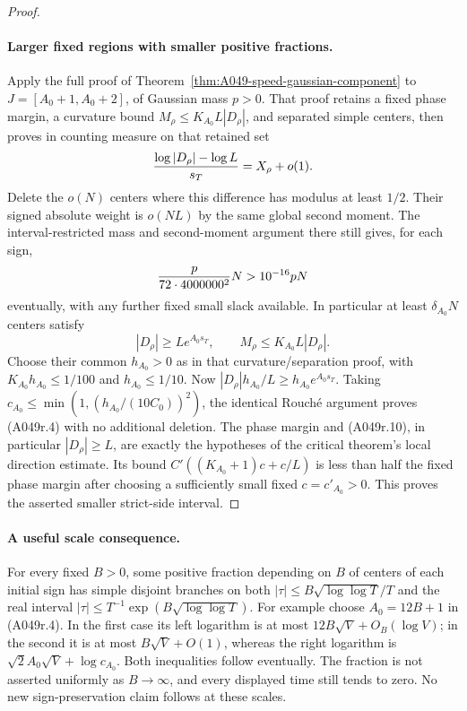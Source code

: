 \begin{proof}
\paragraph{Larger fixed regions with smaller positive fractions.}
Apply the full proof of Theorem~\ref{thm:A049-speed-gaussian-component}
to $J=[A_0+1,A_0+2]$, of Gaussian mass $p>0$.
That proof retains a fixed phase margin, a curvature bound
$M_\rho\le K_{A_0}L|D_\rho|$, and separated simple centers,
then proves in counting measure on that retained set
\[
 {\log|D_\rho|-\log L\over s_T}=X_\rho+o(1).
\]
Delete the $o(N)$ centers where this difference has modulus
at least $1/2$. Their signed absolute weight is $o(NL)$ by the
same global second moment. The interval-restricted mass and
second-moment argument there still gives, for each sign,
\[
 {p\over72\cdot4000000^2}N>10^{-16}pN
\]
eventually, with any further fixed small slack available.
In particular at least $\delta_{A_0}N$ centers satisfy
\[
       |D_\rho|\ge L e^{A_0s_T},\qquad
       M_\rho\le K_{A_0}L|D_\rho|.
\tag{A049r.10}
\]
Choose their common $h_{A_0}>0$ as in that curvature/separation
proof, with $K_{A_0}h_{A_0}\le1/100$ and $h_{A_0}\le1/10$.
Now $|D_\rho|h_{A_0}/L\ge h_{A_0}e^{A_0s_T}$.
Taking
$c_{A_0}\le\min(1,(h_{A_0}/(10C_0))^2)$, the identical
Rouch\'e argument proves (A049r.4) with no additional deletion.
The phase margin and (A049r.10), in particular $|D_\rho|\ge L$,
are exactly the hypotheses of the critical theorem's local
direction estimate. Its bound
$C'((K_{A_0}+1)c+c/L)$ is less than half the fixed phase margin
after choosing a sufficiently small fixed $c=c'_{A_0}>0$.
This proves the asserted smaller strict-side interval.
\end{proof}

\paragraph{A useful scale consequence.}
For every fixed $B>0$, some positive fraction depending on $B$
of centers of each initial sign has simple disjoint branches on
both $|\tau|\le B\sqrt{\log\log T}/T$ and the real interval
$|\tau|\le T^{-1}\exp(B\sqrt{\log\log T})$.
For example choose $A_0=12B+1$ in (A049r.4).
In the first case its left logarithm is at most
$12B\sqrt V+O_B(\log V)$; in the second it is at most
$B\sqrt V+O(1)$, whereas the right logarithm is
$\sqrt2 A_0\sqrt V+\log c_{A_0}$.
Both inequalities follow eventually. The fraction is not asserted
uniformly as $B\to\infty$, and every displayed time still tends
to zero. No new sign-preservation claim follows at these scales.


